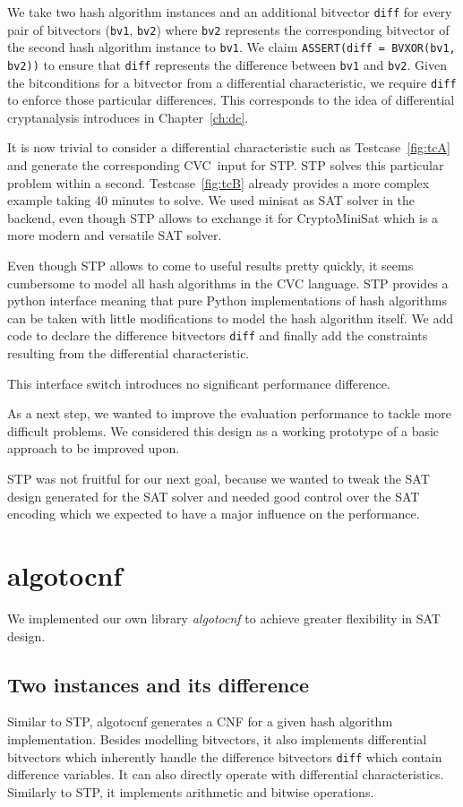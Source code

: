 We take two hash algorithm instances and an additional bitvector \texttt{diff}
for every pair of bitvectors (\texttt{bv1}, \texttt{bv2}) where \texttt{bv2} represents
the corresponding bitvector of the second hash algorithm instance to \texttt{bv1}.
We claim \texttt{ASSERT(diff = BVXOR(bv1, bv2))} to ensure that \texttt{diff}
represents the difference between \texttt{bv1} and \texttt{bv2}. Given the bitconditions
for a bitvector from a differential characteristic, we require \texttt{diff} to enforce
those particular differences. This corresponds to the idea of differential cryptanalysis
introduces in Chapter~\ref{ch:dc}.

It is now trivial to consider a differential characteristic such as Testcase~\ref{fig:tcA}
and generate the corresponding CVC~input for STP. STP solves this particular problem within
a second. Testcase~\ref{fig:tcB} already provides a more complex example taking
40 minutes to solve. We used minisat as SAT solver in the backend, even though STP
allows to exchange it for CryptoMiniSat which is a more modern and versatile SAT solver.

Even though STP allows to come to useful results pretty quickly,
it seems cumbersome to model all hash algorithms in the CVC language.
STP provides a python interface meaning that pure Python implementations
of hash algorithms can be taken with little modifications to model the
hash algorithm itself. We add code to declare the difference bitvectors
\texttt{diff} and finally add the constraints resulting from the differential
characteristic.

This interface switch introduces no significant performance difference.

As a next step, we wanted to improve the evaluation performance to tackle more difficult
problems. We considered this design as a working prototype of a basic approach to be
improved upon.

STP was not fruitful for our next goal, because we wanted to tweak the SAT design generated
for the SAT solver and needed good control over the SAT encoding
which we expected to have a major influence on the performance.

\section{algotocnf}
\label{sec:enc-algotocnf}
%
We implemented our own library \emph{algotocnf} to achieve greater flexibility in SAT design.

\subsection{Two instances and its difference}
\label{sec:enc-original}
%
Similar to STP, algotocnf generates a CNF for a given hash algorithm implementation.
Besides modelling bitvectors, it also implements differential bitvectors which
inherently handle the difference bitvectors \texttt{diff} which contain difference
variables. It can also directly operate with differential characteristics.
Similarly to STP, it implements arithmetic and bitwise operations.

